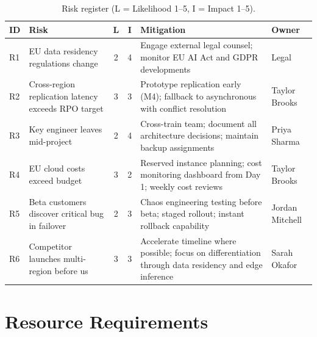 \documentclass[
    language=english,
    doctype=project-charter,
    institution=none,
]{../../omnilatex}
\begin{document}
\begin{table}[h]
    \centering
    \small
    \begin{tabular}{llccp{4cm}p{3cm}}
        \toprule
        \textbf{ID} & \textbf{Risk} & \textbf{L} & \textbf{I} & \textbf{Mitigation} & \textbf{Owner} \\
        \midrule
        R1 & EU data residency regulations change & 2 & 4 & Engage external
            legal counsel; monitor EU AI Act and GDPR developments &
            Legal \\
        R2 & Cross-region replication latency exceeds RPO target & 3 & 3 &
            Prototype replication early (M4); fallback to asynchronous with
            conflict resolution & Taylor Brooks \\
        R3 & Key engineer leaves mid-project & 2 & 4 & Cross-train team;
            document all architecture decisions; maintain backup assignments
            & Priya Sharma \\
        R4 & EU cloud costs exceed budget & 3 & 2 & Reserved instance planning;
            cost monitoring dashboard from Day 1; weekly cost reviews &
            Taylor Brooks \\
        R5 & Beta customers discover critical bug in failover & 2 & 3 &
            Chaos engineering testing before beta; staged rollout; instant
            rollback capability & Jordan Mitchell \\
        R6 & Competitor launches multi-region before us & 3 & 3 & Accelerate
            timeline where possible; focus on differentiation through data
            residency and edge inference & Sarah Okafor \\
        \bottomrule
    \end{tabular}
    \caption{Risk register (L = Likelihood 1--5, I = Impact 1--5).}
\end{table}

\section{Resource Requirements}
\end{document}
